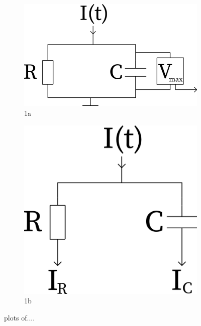 \begin{figure}
    \begin{subfigure}{.5\textwidth}
        \centering
        \includegraphics[width=.8\linewidth]{figures/images/LIFCircuit1.png}
        \caption{1a}
        \label{fig:sfig1}
    \end{subfigure}%
    \begin{subfigure}{.5\textwidth}
        \centering
        \includegraphics[width=.8\linewidth]{figures/images/LIFCircuit2.png}
        \caption{1b}
        \label{fig:sfig2}
    \end{subfigure}
    \caption{plots of....}
    \label{fig:fig}
\end{figure}


